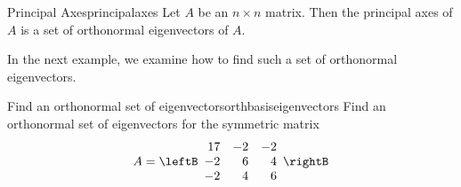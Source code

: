 \begin{definition}{Principal Axes}{principalaxes}
Let $A$ be an $n \times n$ matrix. Then the principal axes of $A$ is a set of orthonormal eigenvectors of $A$.
\end{definition}

In the next example, we examine how to find such a set of orthonormal eigenvectors.

\begin{example}{Find an orthonormal set of eigenvectors}{orthbasiseigenvectors}
Find an orthonormal set of eigenvectors for the symmetric matrix
\begin{equation*}
A = \leftB
\begin{array}{rrr}
17 & -2 & -2 \\
-2 & 6 & 4 \\
-2 & 4 & 6
\end{array}
\rightB
\end{equation*}
\end{example}


